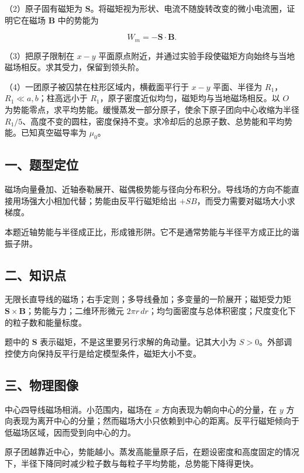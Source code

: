 \documentclass[12pt,a4paper,fontset=fandol]{ctexart}
\begin{document}
（2）原子固有磁矩为
\(\boldsymbol S\)。将磁矩视为形状、电流不随旋转改变的微小电流圈，证明它在磁场
\(\boldsymbol B\) 中的势能为

\[W_m=-\boldsymbol S\cdot\boldsymbol B.\]

（3）把原子限制在 \(x-y\)
平面原点附近，并通过实验手段使磁矩方向始终与当地磁场相反。求其受力，保留到领头阶。

（4）一团原子被囚禁在柱形区域内，横截面平行于 \(x-y\) 平面、半径为
\(R_1\)，\(R_1\ll a,b\)；柱高远小于
\(R_1\)，原子密度近似均匀，磁矩均与当地磁场相反。以 \(O\)
为势能零点，求平均势能。缓慢蒸发一部分原子，使余下原子团向中心收缩为半径
\(R_1/5\)、高度不变的圆柱，密度保持不变。求冷却后的总原子数、总势能和平均势能。已知真空磁导率为
\(\mu_0\)。

\subsection{一、题型定位}\label{ux4e00ux9898ux578bux5b9aux4f4d-4}

磁场向量叠加、近轴泰勒展开、磁偶极势能与径向分布积分。导线场的方向不能直接用场强大小相加代替；势能由反平行磁矩给出
\(+SB\)，而受力需要对磁场大小求梯度。

本题近轴势能与半径成正比，形成锥形阱。它不是通常势能与半径平方成正比的谐振子阱。

\subsection{二、知识点}\label{ux4e8cux77e5ux8bc6ux70b9-4}

无限长直导线的磁场；右手定则；多导线叠加；多变量的一阶展开；磁矩受力矩
\(\boldsymbol S\times\boldsymbol B\)；势能与力；二维环形微元
\(2\pi r\,dr\)；均匀面密度与总体积密度；尺度变化下的粒子数和能量标度。

题中的 \(\boldsymbol S\)
表示磁矩，不是这里要另行求解的角动量。记其大小为
\(S>0\)。外部调控使方向保持反平行是给定模型条件，磁矩大小不变。

\subsection{三、物理图像}\label{ux4e09ux7269ux7406ux56feux50cf-4}

中心四导线磁场相消。小范围内，磁场在 \(x\) 方向表现为朝向中心的分量，在
\(y\)
方向表现为离开中心的分量；然而磁场大小只依赖到中心的距离。反平行磁矩倾向于低磁场区域，因而受到向中心的力。

原子团越靠近中心，势能越小。蒸发高能量原子后，在题设密度和高度固定的情况下，半径下降同时减少粒子数与每粒子平均势能，总势能下降得更快。
\end{document}
